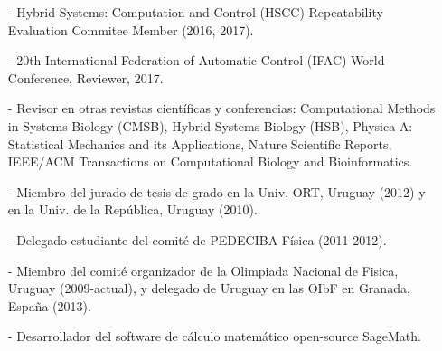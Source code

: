 \documentclass[10pt]{article}
\renewcommand{\section}[2]%
        {\pagebreak[2]\vspace{1.3\baselineskip}%
         \phantomsection\addcontentsline{toc}{section}{#1}%
         \hspace{0in}%
         \marginpar{
         \raggedright \scshape #1}#2}
\begin{document}
\vspace{-0.75cm}

\begin{itemize}
\item[-] Hybrid Systems: Computation and Control (HSCC) Repeatability Evaluation Commitee Member (2016, 2017).
\item[-] 20th International Federation of Automatic Control
(IFAC) World Conference, Reviewer, 2017. 
\item[-] Revisor en otras revistas científicas y conferencias: Computational Methods in Systems Biology (CMSB), Hybrid Systems Biology (HSB), Physica A: Statistical Mechanics and its Applications, Nature Scientific Reports, IEEE/ACM Transactions on Computational Biology and Bioinformatics.
\item[-] Miembro del jurado de tesis de grado en la Univ. ORT, Uruguay (2012) y en la Univ. de la Rep\'{u}blica, Uruguay (2010). 
\item[-] Delegado estudiante del comit\'e de PEDECIBA F\'isica (2011-2012).
\item[-] Miembro del comit\'e organizador de la Olimpiada Nacional de Fisica, Uruguay (2009-actual), y delegado de Uruguay en las OIbF en Granada, España (2013).
\item[-] Desarrollador del software de cálculo matemático open-source SageMath. 
\end{itemize}

%

%
%


 

%
\end{document}
